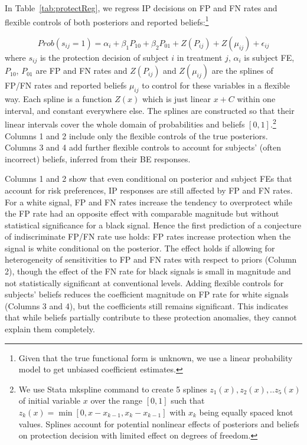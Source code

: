 \documentclass[12pt,a4paper]{article}
\newcommand{\aut}[1]{{\color{Red}#1}}
\begin{document}






In Table~\ref{tab:protectReg}, we regress IP decisions on FP and FN rates and flexible controls of both posteriors and reported beliefs:\footnote{Given that the true functional form is unknown, we use a linear probability model to get unbiased coefficient estimates.}

	\[Prob(s_{ij}=1)=\alpha_i+\beta_1 P_{10}+\beta_2 P_{01} +Z(P_{ij})+Z(\mu_{ij})+\epsilon_{ij} \]
\aut{where $s_{ij}$ is the protection decision of subject $i$ in treatment $j$, $\alpha_i$ is subject FE, $P_{10}$, $P_{01}$ are FP and FN rates and $Z(P_{ij})$ and $Z(\mu_{ij})$ are the splines of FP/FN rates  and reported beliefs $\mu_{ij}$ to control for these variables in a flexible way.} Each spline is a function $Z(x)$ which is just linear $x+C$ within one interval, and constant everywhere else. The splines are constructed so that their linear intervals cover the whole domain of probabilities and beliefs $[0,1]$.\footnote{We use Stata mkspline command to create 5 splines $z_1(x),z_2(x),..z_5(x)$ of initial variable $x$ over the range $[0,1]$ such that $z_k(x)=\min[0,x-x_{k-1},x_k-x_{k-1}]$ with $x_k$ being equally spaced knot values. Splines account for potential nonlinear effects of posteriors and beliefs on protection decision with limited effect on degrees of freedom.} Columns 1 and 2 include only the flexible controls of the true posteriors. Columns 3 and 4 add further flexible controls to account for subjects' (often incorrect) beliefs, inferred from their BE responses.

Columns 1 and 2 show that even conditional on posterior and subject FEs that account for risk preferences, IP responses are still affected by FP and FN rates. For a white signal, FP and FN rates increase the tendency to overprotect while the FP rate had an opposite effect with comparable magnitude but without statistical significance for a black signal. Hence the first prediction of a conjecture of indiscriminate FP/FN rate use holds: FP rates increase protection when the signal is white conditional on the posterior. The effect holds if allowing for heterogeneity of sensitivities to FP and FN rates with respect to priors (Column 2), though the effect of the FN rate for black signals is small in magnitude and not statistically significant at conventional levels. Adding flexible controls for subjects' beliefs reduces the coefficient magnitude on FP rate for white signals (Columns 3 and 4), but the coefficients still remains significant. This indicates that while beliefs partially contribute to these protection anomalies, they cannot explain them completely.
\end{document}
